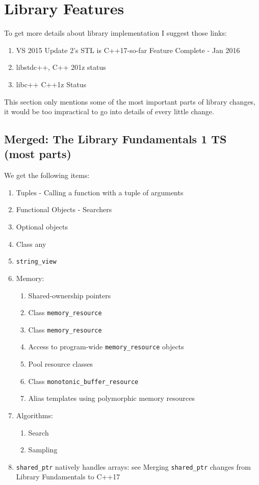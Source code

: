 \section{Library Features}
To get more details about library implementation I suggest those links:

\begin{enumerate}
\item VS 2015 Update 2’s STL is C++17-so-far Feature Complete - Jan 2016
\item libstdc++, C++ 201z status
\item libc++ C++1z Status
\end{enumerate}

This section only mentions some of the most important parts of library changes, it would be too impractical to go into details of every little change.

\subsection{Merged: The Library Fundamentals 1 TS (most parts)}

We get the following items:

\begin{enumerate}
    \item Tuples - Calling a function with a tuple of arguments
    \item Functional Objects - Searchers
    \item Optional objects
    \item Class any
    \item \texttt{string_view}
    \item Memory: 
        \begin{enumerate}
            \item Shared-ownership pointers
            \item Class \texttt{memory_resource}
            \item Class \texttt{memory_resource}
            \item Access to program-wide \texttt{memory_resource} objects
            \item Pool resource classes
            \item Class \texttt{monotonic_buffer_resource}
            \item Alias templates using polymorphic memory resources
        \end{enumerate}
    \item Algorithms: 
       \begin{enumerate}
            \item  Search
            \item Sampling
       \end{enumerate}
    \item \texttt{shared_ptr} natively handles arrays: see Merging \texttt{shared_ptr} changes from Library Fundamentals to C++17
\end{enumerate}

